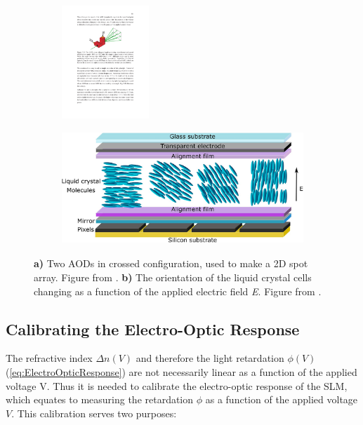 \begin{figure}
	\begin{subfigure}{.39\textwidth}
		\flushleft
		\includegraphics[height=4.25cm]{figures/crossAOD.pdf}
		\caption{}
		\label{fig:CrossAOD}
	\end{subfigure}
	\hfill
	\begin{subfigure}{.59\textwidth}
		\includegraphics[height=4.25cm]{figures/LCoS.png}
		\caption{}
		\label{fig:LCoS}
	\end{subfigure}
	\caption{\textbf{a)} Two \ac{AOD}s in crossed configuration, used to make a 2D spot array. Figure from \cite{Cooper2018}. 
	\textbf{b)} The orientation of the liquid crystal cells changing as a function of the applied electric field \textit{E}. 
	Figure from \cite{Guzman2017}.}
\end{figure}

\subsection{Calibrating the Electro-Optic Response}

The refractive index $\Delta n(V)$ and therefore the light retardation $\phi(V)$ (\cref{eq:ElectroOpticResponse}) are not necessarily linear as a function of the applied voltage V. 
Thus it is needed to calibrate the electro-optic response of the \ac{SLM}, which equates to measuring the retardation $\phi$ as a function of the applied voltage $V$. 
This calibration serves two purposes:

